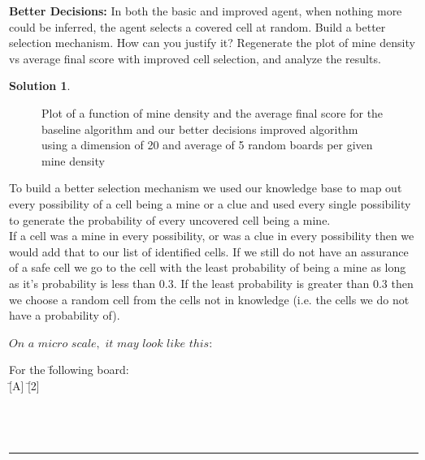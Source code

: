 \documentclass{article}
\theoremstyle{definition}
\def\fline{\rule{0.75\linewidth}{0.5pt}}
\newcommand{\finishline}{\vspace{-15pt}\begin{center}\fline\end{center}}
\newtheorem*{solution*}{Solution}
\newenvironment{solution}{\begin{solution*}}{{\finishline} \end{solution*}}
\begin{document}
\textbf{Better Decisions: }
	In both the basic and improved agent, when nothing more could be inferred, the agent selects a covered cell at random. Build a better selection mechanism. How can you justify it? Regenerate the plot of mine density vs average final score with improved cell selection, and analyze the results.
\begin{solution} \hfill \\
    \begin{figure}[H]
	\centering
	\caption{Plot of a function of mine density and the average final score for the baseline algorithm and our better decisions improved algorithm using a dimension of 20 and average of 5 random boards per given mine density}
	\end{figure}
    To build a better selection mechanism we used our knowledge base to map out every possibility of a cell being a mine or a clue and used every single possibility to generate the probability of every uncovered cell being a mine. \\If a cell was a mine in every possibility, or was a clue in every possibility then we would add that to our list of identified cells. If we still do not have an assurance of a safe cell we go to the cell with the least probability of being a mine as long as it's probability is less than 0.3. If the least probability is greater than 0.3 then we choose a random cell from the cells not in knowledge (i.e. the cells we do not have a probability of). 
    
    $On$ $a$ $micro$ $scale,$ $it$ $may$ $look$ $like$ $this$: 
    \begin{tabbing}
    For the \=following board:\\
    \>[1] \=[A] \=[2] \\ 
    \>[B] \>[C] \>[D] \\
    \>[E] \>[3] \>[F] \\\\ 
    

\end{tabbing}
\end{solution}
\end{document}
